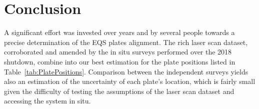 \section{\label{sec:conc} Conclusion}
\medskip


A significant effort was invested over years and by several people towards a precise determination of the EQS plates alignment.
The rich laser scan dataset, corroborated and amended by the in situ surveys performed over the 2018 shutdown, combine into our best estimation for the plate positions listed in Table~\ref{tab:PlatePositions}.
Comparison between the independent surveys yields also an estimation of the uncertainty of each plate's location, which is fairly small given the difficulty of testing the assumptions of the laser scan dataset and accessing the system in situ.


